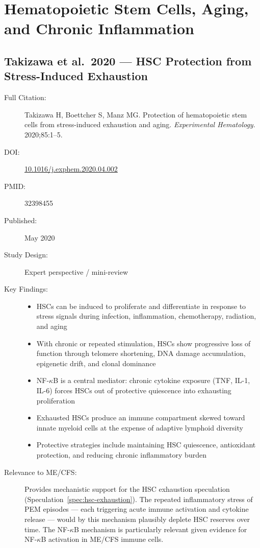 \section{Hematopoietic Stem Cells, Aging, and Chronic Inflammation}
\label{sec:bib-hsc-aging}

\subsection{Takizawa et al.\ 2020 --- HSC Protection from Stress-Induced Exhaustion}

\begin{description}
    \item[Full Citation:] Takizawa H, Boettcher S, Manz MG. Protection of hematopoietic stem cells from stress-induced exhaustion and aging. \textit{Experimental Hematology}. 2020;85:1--5.
    \item[DOI:] \href{https://doi.org/10.1016/j.exphem.2020.04.002}{10.1016/j.exphem.2020.04.002}
    \item[PMID:] 32398455
    \item[Published:] May 2020
    \item[Study Design:] Expert perspective / mini-review
    \item[Key Findings:]
    \begin{itemize}
        \item HSCs can be induced to proliferate and differentiate in response to stress signals during infection, inflammation, chemotherapy, radiation, and aging
        \item With chronic or repeated stimulation, HSCs show progressive loss of function through telomere shortening, DNA damage accumulation, epigenetic drift, and clonal dominance
        \item NF-$\kappa$B is a central mediator: chronic cytokine exposure (TNF, IL-1, IL-6) forces HSCs out of protective quiescence into exhausting proliferation
        \item Exhausted HSCs produce an immune compartment skewed toward innate myeloid cells at the expense of adaptive lymphoid diversity
        \item Protective strategies include maintaining HSC quiescence, antioxidant protection, and reducing chronic inflammatory burden
    \end{itemize}
    \item[Relevance to ME/CFS:] Provides mechanistic support for the HSC exhaustion speculation (Speculation~\ref{spec:hsc-exhaustion}). The repeated inflammatory stress of PEM episodes --- each triggering acute immune activation and cytokine release --- would by this mechanism plausibly deplete HSC reserves over time. The NF-$\kappa$B mechanism is particularly relevant given evidence for NF-$\kappa$B activation in ME/CFS immune cells.

\end{description}
